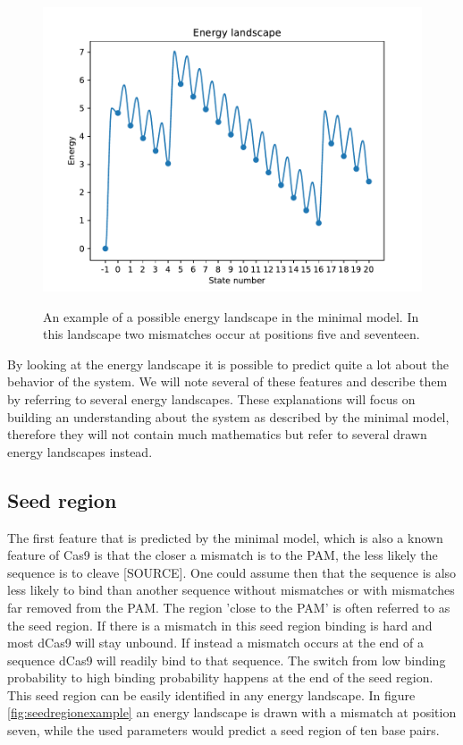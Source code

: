 \begin{figure}[H]
\begin{center}
\includegraphics[width=\textwidth]{images/examplelandscapeminmodel}
\label{fig:examplelandscapeminmodel}
\caption{An example of a possible energy landscape in the minimal model. In this landscape two mismatches occur at positions five and seventeen.}
\end{center}
\end{figure}

By looking at the energy landscape it is possible to predict quite a lot about the behavior of the system. We will note several of these features and describe them by referring to several energy landscapes. These explanations will focus on building an understanding about the system as described by the minimal model, therefore they will not contain much mathematics but refer to several drawn energy landscapes instead.

\subsection{Seed region}
The first feature that is predicted by the minimal model, which is also a known feature of Cas9 is that the closer a mismatch is to the PAM, the less likely the sequence is to cleave [SOURCE]. One could assume then that the sequence is also less likely to bind than another sequence without mismatches or with mismatches far removed from the PAM. The region 'close to the PAM' is often referred to as the seed region. If there is a mismatch in this seed region binding is hard and most dCas9 will stay unbound. If instead a mismatch occurs at the end of a sequence dCas9 will readily bind to that sequence. The switch from low binding probability to high binding probability happens at the end of the seed region. This seed region can be easily identified in any energy landscape. In figure \ref{fig:seedregionexample} an energy landscape is drawn with a mismatch at position seven, while the used parameters would predict a seed region of ten base pairs.

